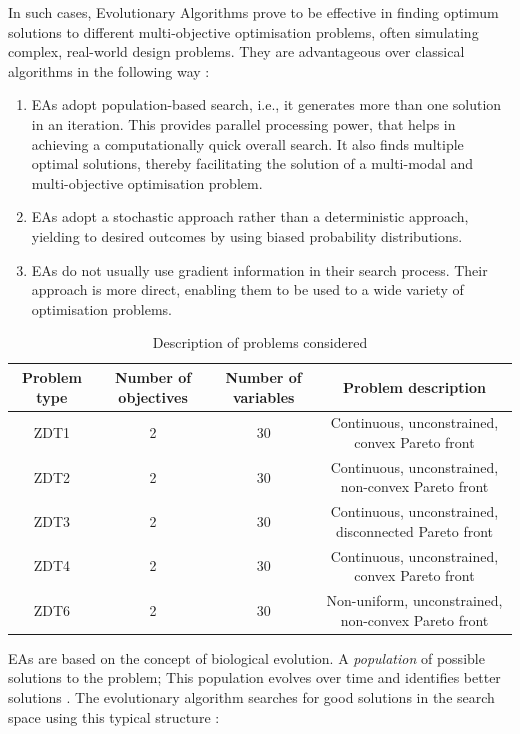 \documentclass[sigconf, nonacm, preprint]{acmart}
\begin{document}
In such cases, Evolutionary Algorithms prove to be effective in finding optimum solutions to different multi-objective optimisation problems, often simulating complex, real-world design problems. They are advantageous over classical algorithms in the following way \cite{branke2008}:
\begin{enumerate}
\item EAs adopt population-based search, i.e., it generates more than one solution in an iteration. This provides parallel processing power, that helps in achieving a computationally quick overall search. It also finds multiple optimal solutions, thereby facilitating the solution of a multi-modal and multi-objective optimisation problem.
\item EAs adopt a stochastic approach rather than a deterministic approach, yielding to desired outcomes by using biased probability distributions.
\item EAs do not usually use gradient information in their search process. Their approach is more direct, enabling them to be used to a wide variety of optimisation problems.
\end{enumerate}
\begin{table}[t]
\centering
\begin{tabular}{|c|c|c|c|}
\hline
Problem type & Number of objectives & Number of variables & Problem description \\
\hline
ZDT1 & 2 & 30 & Continuous, unconstrained, convex Pareto front \\
ZDT2 & 2 & 30 & Continuous, unconstrained, non-convex Pareto front \\
ZDT3 & 2 & 30 & Continuous, unconstrained, disconnected Pareto front \\
ZDT4 & 2 & 30 & Continuous, unconstrained, convex Pareto front \\
ZDT6 & 2 & 30 & Non-uniform, unconstrained, non-convex Pareto front \\
\hline
\end{tabular}
\caption{Description of problems considered \cite{pymoo2022}}
\end{table}
EAs are based on the concept of biological evolution. A \textit{population} of possible solutions to the problem; This population evolves over time and identifies better solutions \cite{leach2007}. The evolutionary algorithm searches for good solutions in the search space using this typical structure \cite{altenberg2016}:
\end{document}
